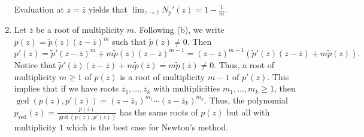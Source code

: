 \documentclass[letterpaper, 11pt, oneside]{book}
\begin{document}
\begin{pf}
\begin{enumerate}[label= (\alph*)]
\[          \]
          Evaluation at $z = \overline{z}$ yields that $\lim_{z \to \overline{z}} N_{p}'(z) = 1 - \frac{1}{m}$.
    \item Let $\overline{z}$ be a root of multiplicity $m$.
          Following (b), we write $p(z) = \tilde{p}(z)(z - \overline{z})^{m}$ such that $\tilde{p}(\overline{z}) \neq 0$.
          Then
          \[
            p'(z) = \tilde{p}'(z - \overline{z})^{m} + m\tilde{p}(z)(z - \overline{z})^{m - 1} = (z - \overline{z})^{m - 1}(\tilde{p}'(z)(z - \overline{z}) + m\tilde{p}(z)).
          \]
          Notice that $\tilde{p}'(\overline{z})(\overline{z} - \overline{z}) + m\tilde{p}(\overline{z}) = m\tilde{p}(\overline{z}) \neq 0$.
          Thus, a root of multiplicity $m \geq 1$ of $p(z)$ is a root of multiplicity $m - 1$ of $p'(z)$.
          This implies that if we have roots $\overline{z}_{1}, \ldots, \overline{z}_{k}$ with multiplicities $m_{1}, \ldots, m_{k} \geq 1$, then $\gcd(p(z), p'(z)) = (z - \overline{z}_{1})^{m_{1}} \cdots (z - \overline{z}_{k})^{m_{k}}$.
          Thus, the polynomial $p_{\mathrm{red}}(z) = \frac{p(z)}{\gcd(p(z), p'(z))}$ has the same roots of $p(z)$ but all with multiplicity $1$ which is the best case for Newton's method.
  \end{enumerate}
\end{pf}

\printbibliography
\end{document}
